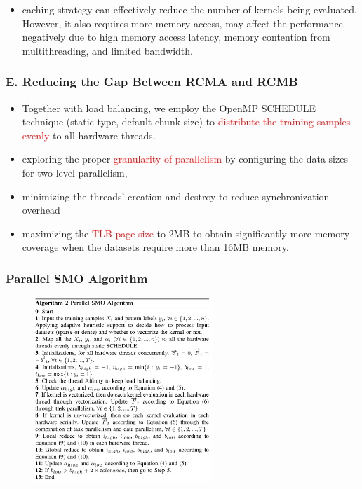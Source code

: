 \documentclass{beamer}
\begin{document}
\begin{frame}
\begin{columns}[c]
	\end{columns}	
		\begin{itemize}
			\item caching strategy can
			effectively reduce the number of kernels being evaluated. However,
			it also requires more memory access, may affect the performance negatively due to high memory
			access latency, memory contention from multithreading, and limited
			bandwidth. 			
		\end{itemize}		
\end{frame}

\begin{frame}
	\frametitle{E. Reducing the Gap Between RCMA and RCMB}
	\begin{itemize}
		\item Together with load balancing, we employ the
		OpenMP SCHEDULE technique (static type, default chunk size)
		to \textcolor{red}{distribute the training samples evenly} to all hardware threads. 
		\item exploring the proper \textcolor{red}{granularity of
		parallelism} by configuring the data sizes for two-level parallelism,
		\item minimizing the threads’ creation and destroy to reduce synchronization overhead
		\item maximizing the \textcolor{red}{TLB page size} to 2MB to obtain
		significantly more memory coverage when the datasets require more
		than 16MB memory.	
		 			
	\end{itemize}		
\end{frame}

\begin{frame}
	\frametitle{Parallel SMO Algorithm}	
	\begin{figure}
		\includegraphics[width=0.6\textwidth]{figs/smo_parallelalgo.png}
	\end{figure} 
\end{frame}
\end{document}
